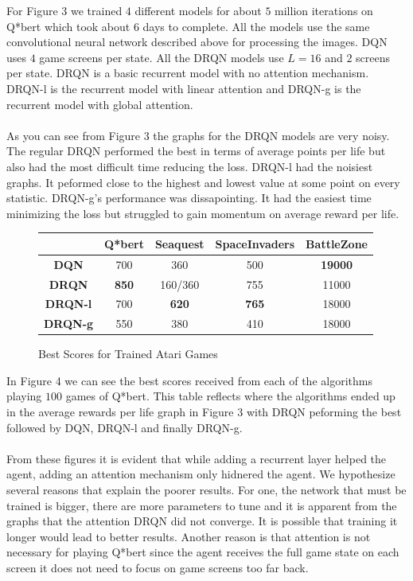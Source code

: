\documentclass{article}
\begin{document}
For Figure 3 we trained $4$ different models for about $5$ million iterations on
Q*bert which took about $6$ days to complete. All the models use the same
convolutional neural network described above for processing the images. DQN uses
$4$ game screens per state. All the DRQN models use $L=16$ and $2$ screens per
state. DRQN is a basic recurrent model with no attention mechanism. DRQN-l is the
recurrent model with linear attention and DRQN-g is the recurrent model with
global attention. \\
\\
As you can see from Figure 3 the graphs for the DRQN models are very noisy. The
regular DRQN performed the best in terms of average points per life but also had
the most difficult time reducing the loss. DRQN-l had the noisiest graphs. It
peformed close to the highest and lowest value at some point on every statistic.
DRQN-g's performance was dissapointing. It had the easiest time minimizing the loss
but struggled to gain momentum on average reward per life. \\

\begin{figure}[h]
    \begin{center}
        \begin{tabular}{| c | c | c | c | c |}
            \hline
            & \textbf{Q*bert} & \textbf{Seaquest} & \textbf{SpaceInvaders} & \textbf{BattleZone} \\ \hline
            \textbf{DQN} & 700 & 360 & 500 & \textbf{19000} \\ \hline 
            \textbf{DRQN} & \textbf{850} & 160/360 & 755 & 11000 \\ \hline
            \textbf{DRQN-l} & 700 & \textbf{620} & \textbf{765} & 18000 \\ \hline
            \textbf{DRQN-g} & 550 & 380 & 410 & 18000 \\ \hline
        \end{tabular}
    \end{center}
    \caption{Best Scores for Trained Atari Games}
\end{figure}

In Figure 4 we can see the best scores received from each of the algorithms playing
$100$ games of Q*bert. This table reflects where the algorithms ended up in the
average rewards per life graph in Figure 3 with DRQN peforming the best followed
by DQN, DRQN-l and finally DRQN-g. \\
\\
From these figures it is evident that while adding a recurrent layer helped the
agent, adding an attention mechanism only hidnered the agent. We hypothesize
several reasons that explain the poorer results. For one, the network that must
be trained is bigger, there are more parameters to tune and it is apparent from
the graphs that the attention DRQN did not converge. It is possible that training
it longer would lead to better results. Another reason is that attention is not
necessary for playing Q*bert since the agent receives the full game state on each
screen it does not need to focus on game screens too far back.
\end{document}
